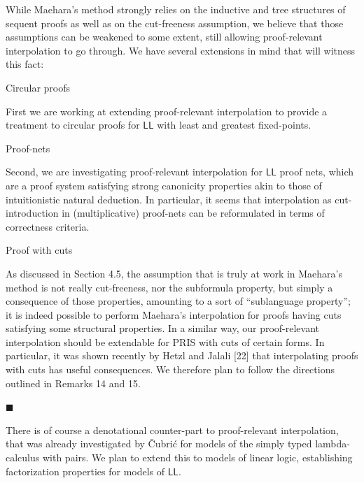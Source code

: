 \documentclass[10pt,a4paper]{article}
\begin{document}
While Maehara’s method strongly relies on the inductive and tree structures of sequent proofs as well as on the cut-freeness assumption, we believe that those assumptions can be weakened to some extent, still allowing proof-relevant interpolation to go through. We have several extensions in mind that will witness this fact:\par
  Circular proofs  
 
First we are working at extending proof-relevant interpolation to provide a treatment to circular proofs for $\mathsf{LL}$ with least and greatest fixed-points.\par
 
  Proof-nets  
 
Second, we are investigating proof-relevant interpolation for $\mathsf{LL}$ proof nets, which are a proof system satisfying strong canonicity properties akin to those of intuitionistic natural deduction. In particular, it seems that interpolation as cut-introduction in (multiplicative) proof-nets can be reformulated in terms of correctness criteria.\par
 
  Proof with cuts  
 
As discussed in Section 4.5, the assumption that is truly at work in Maehara’s method is not really cut-freeness, nor the subformula property, but simply a consequence of those properties, amounting to a sort of “sublanguage property”; it is indeed possible to perform Maehara’s interpolation for proofs having cuts satisfying some structural properties. In a similar way, our proof-relevant interpolation should be extendable for PRIS with cuts of certain forms. In particular, it was shown recently by Hetzl and Jalali [22] that interpolating proofs with cuts has useful consequences. We therefore plan to follow the directions outlined in Remarks 14 and 15.\par
 
   
 
 
\par\noindent  $\blacksquare$ 
 
There is of course a denotational counter-part to proof-relevant interpolation, that was already investigated by Čubrić for models of the simply typed lambda-calculus with pairs. We plan to extend this to models of linear logic, establishing factorization properties for models of $\mathsf{LL}$.\par
 
\end{document}

